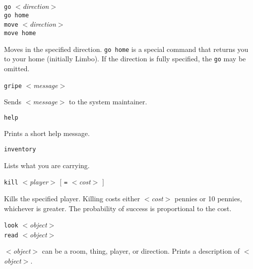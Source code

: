 \begin{simple}
\dorule

\item[]
\begin{flushleft}
{\tt go} $<${\em direction\/}$>$ \\
{\tt go home} \\
{\tt move} $<${\em direction\/}$>$ \\
{\tt move home}
\end{flushleft}

Moves in the specified direction.  {\tt go home} is a special command
that returns you to your home (initially Limbo).  If the direction is
fully specified, the {\tt go} may be omitted.

\dorule

\item[]
\begin{flushleft}
{\tt gripe} $<${\em message\/}$>$
\end{flushleft}
Sends $<${\em message\/}$>$ to the system maintainer.

\dorule

\item[]
\begin{flushleft}
{\tt help}
\end{flushleft}
Prints a short help message.

\dorule

\item[]
\begin{flushleft}
{\tt inventory}
\end{flushleft}
Lists what you are carrying.

\dorule

\item[]
\begin{flushleft}
{\tt kill} $<${\em player\/}$>$ $[$ \verb|=| $<${\em cost\/}$>$ $]$
\end{flushleft}
Kills the specified player.  Killing costs either $<${\em cost\/}$>$
pennies or 10 pennies, whichever is greater.  The probability of
success is proportional to the cost.

\dorule

\item[]
\begin{flushleft}
{\tt look} $<${\em object\/}$>$ \\
{\tt read} $<${\em object\/}$>$
\end{flushleft}
$<${\em object\/}$>$ can be a room, thing, player, or direction.  Prints
a description of $<${\em object\/}$>$.


\end{simple}
